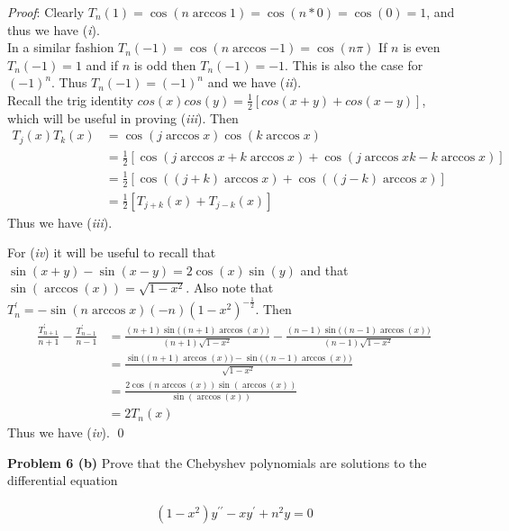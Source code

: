 \documentclass[12pt]{article}
\newcommand{\problem}[1]{\hspace{-4 ex} \large \textbf{Problem #1} }
\renewenvironment{proof}{\hspace{-4 ex} \emph{Proof}:}{\qed}
\begin{document}
	\begin{proof}
		Clearly $T_n(1) = \cos{(n \arccos{1})} = \cos{(n*0)} = \cos{(0)} = 1$, and thus we have (\emph{i}). \\
		
		In a similar fashion $T_n(-1) = \cos{(n \arccos{-1})} = \cos(n\pi)$ If $n$ is even $T_n(-1) = 1$ and if $n$ is odd then $T_n(-1)=-1$. This is also the case for $(-1)^n$. Thus $T_n(-1) = (-1)^n$ and we have (\emph{ii}). \\
		
		Recall the trig identity $cos(x)cos(y) = \tfrac{1}{2}[cos(x+y) + cos(x-y)]$, which will be useful in proving (\emph{iii}). Then
		\begin{align*}
			T_j(x)T_k(x) & = \cos(j \arccos{x}) \cos(k \arccos{x}) \\
			& = \tfrac{1}{2}[ \cos(j \arccos{x} + k \arccos{x}) +  \cos(j \arccos{x} k - k \arccos{x}) ] \\
			& = \tfrac{1}{2}[ \cos( (j + k) \arccos{x}) + \cos( (j - k) \arccos{x}) ]\\
			& = \tfrac{1}{2}[ T_{j+k}(x) + T_{j-k}(x)]
		\end{align*}
		Thus we have (\emph{iii}). \bigbreak
		
		For (\emph{iv}) it will be useful to recall that $\sin(x+y) - \sin(x-y) = 2 \cos(x) \sin(y)$ and that $\sin(\arccos(x)) = \sqrt{1-x^2}$. Also note that $T_n^\prime = -\sin{(n \arccos{x})} (-n)(1-x^2)^{-\frac{1}{2}}$. Then
		\begin{align*}
			\frac{T_{n+1}^\prime}{n+1} - \frac{T_{n-1}^\prime}{n-1} & = \frac{(n+1) \sin\big((n+1) \arccos(x) \big)}{(n+1)\sqrt{1-x^2}} - \frac{(n-1) \sin\big((n-1) \arccos(x) \big)}{(n-1)\sqrt{1-x^2}} \\
			& = \frac{ \sin\big((n+1) \arccos(x) \big) - \sin\big((n-1) \arccos(x) \big) } { \sqrt{1-x^2} } \\
			& =  \frac{2 \cos(n \arccos(x)) \sin(\arccos(x))}{ \sin(\arccos(x))} \\
			& = 2 T_n(x)
		\end{align*}
		Thus we have (\emph{iv}).		
	\end{proof}

\problem{6 (b)} Prove that the Chebyshev polynomials are solutions to the differential equation
	
	\begin{align}\label{p1eq2}
	(1-x^2)y^{\prime\prime}-xy^\prime+n^2y=0
	\end{align}
	
\end{document}
